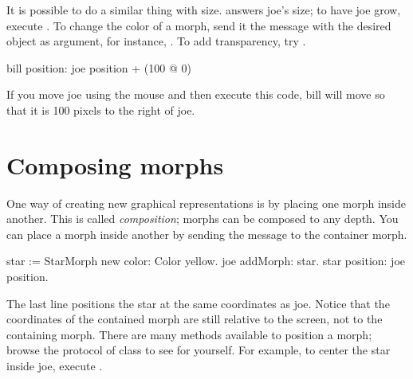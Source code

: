 \documentclass[a4paper,10pt,twoside]{book}
\begin{document}
It is possible to do a similar thing with size.
  answers joe's size; to have joe grow, execute .
To change the color of a morph, send it the  message with the desired  object as argument, for instance, .
To add transparency, try .

\begin{code}{}
bill position: joe position + (100 @ 0)
\end{code}
\noindent
If you move joe using the mouse and then execute this code, bill will move so that it is 100 pixels to the right of joe.

\section{Composing morphs}

One way of creating new graphical representations is by placing one morph inside another.
This is called \emph{composition}; morphs can be composed to any depth.
%
You can place a morph inside another by sending the message  to the container morph.

\begin{code}{}
star := StarMorph new color: Color yellow.
joe addMorph: star.
star position: joe position.
\end{code}

\noindent
The last line positions the star at the same coordinates as joe.
Notice that the coordinates of the contained morph are still relative to the screen, not to the containing morph.
There are many  methods available to position a morph; browse the  protocol of class  to see for yourself.
For example, to center the star inside joe, execute   .
\end{document}
